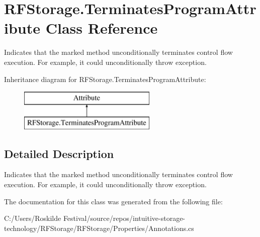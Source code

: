 \section{R\+F\+Storage.\+Terminates\+Program\+Attribute Class Reference}
\label{class_r_f_storage_1_1_terminates_program_attribute}


Indicates that the marked method unconditionally terminates control flow execution. For example, it could unconditionally throw exception.  


Inheritance diagram for R\+F\+Storage.\+Terminates\+Program\+Attribute\+:\begin{figure}[H]
\begin{center}
\leavevmode
\includegraphics[height=2.000000cm]{class_r_f_storage_1_1_terminates_program_attribute}
\end{center}
\end{figure}


\subsection{Detailed Description}
Indicates that the marked method unconditionally terminates control flow execution. For example, it could unconditionally throw exception. 



The documentation for this class was generated from the following file\+:\begin{DoxyCompactItemize}
\item 
C\+:/\+Users/\+Roskilde Festival/source/repos/intuitive-\/storage-\/technology/\+R\+F\+Storage/\+R\+F\+Storage/\+Properties/Annotations.\+cs\end{DoxyCompactItemize}
